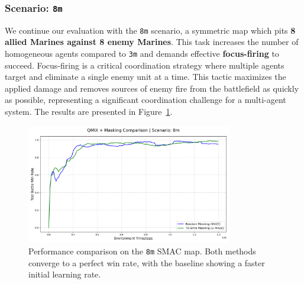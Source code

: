 
\subsubsection{Scenario: \texttt{8m}}
We continue our evaluation with the \texttt{8m} scenario, a symmetric map which pits \textbf{8 allied Marines against 8 enemy Marines}. This task increases the number of homogeneous agents compared to \texttt{3m} and demands effective \textbf{focus-firing} to succeed. Focus-firing is a critical coordination strategy where multiple agents target and eliminate a single enemy unit at a time. This tactic maximizes the applied damage and removes sources of enemy fire from the battlefield as quickly as possible, representing a significant coordination challenge for a multi-agent system. The results are presented in Figure~\ref{fig:8m}.

\begin{figure}[H]
    \centering
    \includegraphics[width=0.8\textwidth]{images_pfe/results_li-ma2e/comparison_plot_8m.png}
    \caption{Performance comparison on the \texttt{8m} SMAC map. Both methods converge to a perfect win rate, with the baseline showing a faster initial learning rate.}
    \label{fig:8m}
\end{figure}
